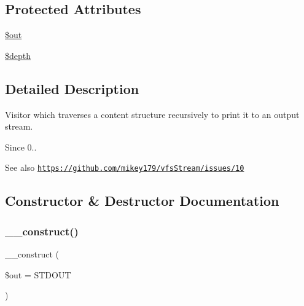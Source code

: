 \subsection*{Protected Attributes}
\begin{DoxyCompactItemize}
\item 
\mbox{\hyperlink{classorg_1_1bovigo_1_1vfs_1_1visitor_1_1vfs_stream_print_visitor_a48cb304902320d173a4eaa41543327b9}{\$out}}
\item 
\mbox{\hyperlink{classorg_1_1bovigo_1_1vfs_1_1visitor_1_1vfs_stream_print_visitor_a0abb04e6a8a04e161eb4657f54848b18}{\$depth}}
\end{DoxyCompactItemize}


\subsection{Detailed Description}
Visitor which traverses a content structure recursively to print it to an output stream.

\begin{DoxySince}{Since}
0.. 
\end{DoxySince}
\begin{DoxySeeAlso}{See also}
\href{https://github.com/mikey179/vfsStream/issues/10}{\tt https\+://github.\+com/mikey179/vfs\+Stream/issues/10} 
\end{DoxySeeAlso}


\subsection{Constructor \& Destructor Documentation}
\mbox{\label{classorg_1_1bovigo_1_1vfs_1_1visitor_1_1vfs_stream_print_visitor_a06fa66ede64ad757c3c997c171c754db}} 
\subsubsection{\texorpdfstring{\+\_\+\+\_\+construct()}{\_\_construct()}}
{\footnotesize\ttfamily \+\_\+\+\_\+construct (\begin{DoxyParamCaption}\item[{}]{\$out = {\ttfamily STDOUT} }\end{DoxyParamCaption})}

